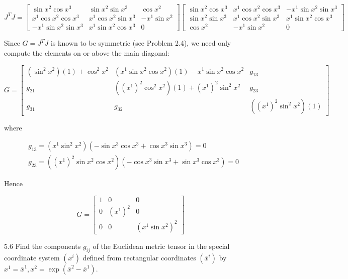 \documentclass[10pt]{article}
\begin{document}
$$
J^{T} J=\left[\begin{array}{ccc}
\sin x^{2} \cos x^{3} & \sin x^{2} \sin x^{3} & \cos x^{2} \\
x^{1} \cos x^{2} \cos x^{3} & x^{1} \cos x^{2} \sin x^{3} & -x^{1} \sin x^{2} \\
-x^{1} \sin x^{2} \sin x^{3} & x^{1} \sin x^{2} \cos x^{3} & 0
\end{array}\right]\left[\begin{array}{ccc}
\sin x^{2} \cos x^{3} & x^{1} \cos x^{2} \cos x^{3} & -x^{1} \sin x^{2} \sin x^{3} \\
\sin x^{2} \sin x^{3} & x^{1} \cos x^{2} \sin x^{3} & x^{1} \sin x^{2} \cos x^{3} \\
\cos x^{2} & -x^{1} \sin x^{2} & 0
\end{array}\right]
$$

Since $G=J^{T} J$ is known to be symmetric (see Problem 2.4), we need only compute the elements on or above the main diagonal:

$$
G=\left[\begin{array}{ccc}
\left(\sin ^{2} x^{2}\right)(1)+\cos ^{2} x^{2} & \left(x^{1} \sin x^{2} \cos x^{2}\right)(1)-x^{1} \sin x^{2} \cos x^{2} & g_{13} \\
g_{21} & \left(\left(x^{1}\right)^{2} \cos ^{2} x^{2}\right)(1)+\left(x^{1}\right)^{2} \sin ^{2} x^{2} & g_{23} \\
g_{31} & g_{32} & \left(\left(x^{1}\right)^{2} \sin ^{2} x^{2}\right)(1)
\end{array}\right]
$$

where

$$
\begin{aligned}
& g_{13}=\left(x^{1} \sin ^{2} x^{2}\right)\left(-\sin x^{3} \cos x^{3}+\cos x^{3} \sin x^{3}\right)=0 \\
& g_{23}=\left(\left(x^{1}\right)^{2} \sin x^{2} \cos x^{2}\right)\left(-\cos x^{3} \sin x^{3}+\sin x^{3} \cos x^{3}\right)=0
\end{aligned}
$$

Hence

$$
G=\left[\begin{array}{ccc}
1 & 0 & 0 \\
0 & \left(x^{1}\right)^{2} & 0 \\
0 & 0 & \left(x^{1} \sin x^{2}\right)^{2}
\end{array}\right]
$$

5.6 Find the components $g_{i j}$ of the Euclidean metric tensor in the special coordinate system $\left(x^{i}\right)$ defined from rectangular coordinates $\left(\bar{x}^{i}\right)$ by $x^{1}=\bar{x}^{1}, x^{2}=\exp \left(\bar{x}^{2}-\bar{x}^{1}\right)$.
\end{document}

